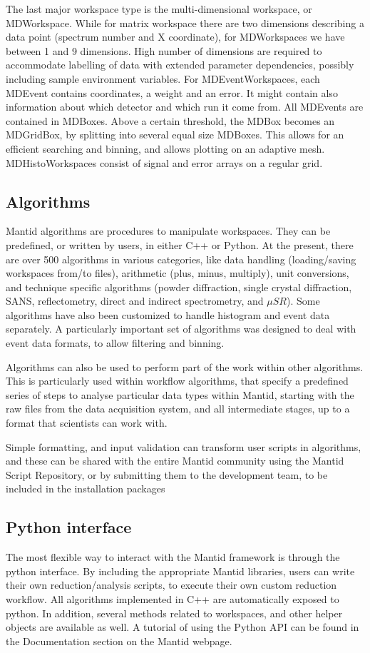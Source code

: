 \documentclass{elsarticle}
\begin{document}
The last major workspace type is the multi-dimensional workspace, or MDWorkspace. While for matrix workspace there are two dimensions describing a data point (spectrum number and X coordinate), for MDWorkspaces we have between 1 and 9 dimensions. High number of dimensions are required to accommodate labelling of data with extended parameter dependencies, possibly including sample environment variables. For MDEventWorkspaces, each MDEvent contains coordinates, a weight and an error. It might contain also information about which detector and which run it come from. All MDEvents are contained in MDBoxes. Above a certain threshold, the MDBox becomes an MDGridBox, by splitting into several equal size MDBoxes. This allows for an efficient searching and binning, and allows plotting on an adaptive mesh. MDHistoWorkspaces consist of signal and error arrays on a regular grid.  

\subsection{Algorithms}
Mantid algorithms are procedures to manipulate workspaces. They can be predefined, or written by users, in either C++ or Python. At the present, there are over 500 algorithms in various categories, like data handling (loading/saving workspaces from/to files), arithmetic (plus, minus, multiply), unit conversions, and technique specific algorithms (powder diffraction, single crystal diffraction, SANS, reflectometry, direct and indirect spectrometry, and $\mu SR$). Some algorithms have also been customized to handle histogram and event data separately. A particularly important set of algorithms was designed to deal with event data formats, to allow filtering and binning.

Algorithms can also be used to perform part of the work within other algorithms. This is particularly used within workflow algorithms, that specify a predefined series of steps to analyse particular data types within Mantid, starting with the raw files from the data acquisition system, and all intermediate stages, up to a format that scientists can work with.

Simple formatting, and input validation can transform user scripts in algorithms, and these can be shared with the entire Mantid community using the Mantid Script Repository, or by submitting them to the development team, to be included in the installation packages


\subsection{Python interface}
The most flexible way to interact with the Mantid framework is through the python interface. By including the appropriate Mantid libraries, users can write their own reduction/analysis scripts, to execute their own custom reduction workflow. All algorithms implemented in C++ are automatically exposed to python. In addition, several methods related to workspaces, and other helper objects are available as well. A tutorial of using the Python API can be found in the Documentation section on the Mantid webpage\cite{webpage}.  
\end{document}
